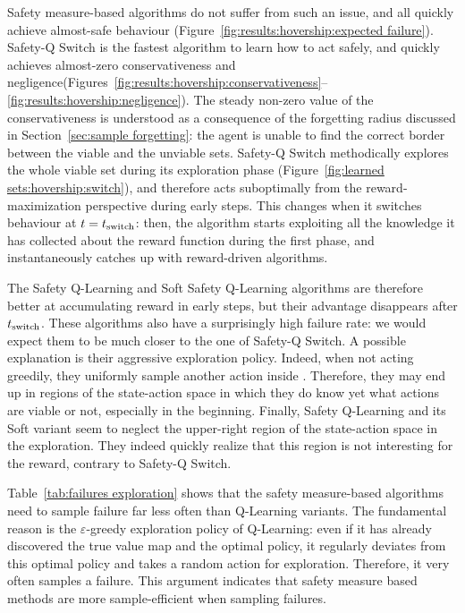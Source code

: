Safety measure-based algorithms do not suffer from such an issue, and all quickly achieve almost-safe behaviour (Figure~\ref{fig:results:hovership:expected failure}). Safety-Q Switch is the fastest algorithm to learn how to act safely, and quickly achieves almost-zero conservativeness and negligence(Figures~\ref{fig:results:hovership:conservativeness}--\ref{fig:results:hovership:negligence}). The steady non-zero value of the conservativeness is understood as a consequence of the forgetting radius discussed in Section~\ref{sec:sample forgetting}: the agent is unable to find the correct border between the viable and the unviable sets. Safety-Q Switch methodically explores the whole viable set during its exploration phase (Figure~\ref{fig:learned sets:hovership:switch}), and therefore acts suboptimally from the reward-maximization perspective during early steps. This changes when it switches behaviour at $t=t_\text{switch}$: then, the algorithm starts exploiting all the knowledge it has collected about the reward function during the first phase, and instantaneously catches up with reward-driven algorithms.\par
The Safety Q-Learning and Soft Safety Q-Learning algorithms are therefore better at accumulating reward in early steps, but their advantage disappears after $t_\text{switch}$. These algorithms also have a surprisingly high failure rate: we would expect them to be much closer to the one of Safety-Q Switch. A possible explanation is their aggressive exploration policy. Indeed, when not acting greedily, they uniformly sample another action inside \Qcaut. Therefore, they may end up in regions of the state-action space in which they do know yet what actions are viable or not, especially in the beginning. Finally, Safety Q-Learning and its Soft variant seem to neglect the upper-right region of the state-action space in the exploration. They indeed quickly realize that this region is not interesting for the reward, contrary to Safety-Q Switch.\par
Table~\ref{tab:failures exploration} shows that the safety measure-based algorithms need to sample failure far less often than Q-Learning variants. The fundamental reason is the $\varepsilon$-greedy exploration policy of Q-Learning: even if it has already discovered the true value map and the optimal policy, it regularly deviates from this optimal policy and takes a random action for exploration. Therefore, it very often samples a failure. This argument indicates that safety measure based methods are more sample-efficient when sampling failures.

